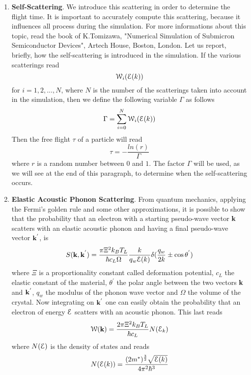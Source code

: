 \documentclass[12pt]{book}
\begin{document}
\begin{enumerate}
\item
\textbf{Self-Scattering}. We introduce this scattering in order to determine the flight time. It is important to accurately compute this scattering, because it influences all process during the simulation. For more informations about this topic, read the book of K.Tomizawa, "Numerical Simulation of Submicron Semiconductor Devices", Artech House, Boston, London.
Let us report, briefly, how the self-scattering is introduced in the simulation. If the various scatterings read
$$ {\cal{W}}_i({\cal{E}}(k)) $$
for $i=1,2,...,N$, where $N$ is the number of the scatterings taken into account in the simulation, then we define the following variable $\Gamma$ as follows
\begin{equation}
 \Gamma = \sum_{i=0}^{N} {\cal{W}}_i ({\cal{E}} (k) )
\end{equation}
Then the free flight $\tau$ of a particle will read
\begin{equation}
 \tau = -\frac{ln(r)}{\Gamma}
\end{equation}
where $r$ is a random number between $0$ and $1$.
The factor $\Gamma$ will be used, as we will see at the end of this paragraph, to determine when the self-scattering occurs.

\item
\textbf{Elastic Acoustic Phonon Scattering}.
From quantum mechanics, applying the Fermi's golden rule and some other approximations, it is possible to show that the probability that an electron with a starting pseudo-wave vector $\bf{k}$ scatters with an elastic acoustic phonon and having a final pseudo-wave vector ${\bf{k}}^{'}$, is
\begin{equation}
 S({\bf{k}},{\bf{k}}^{'}) = \frac{\pi \Xi^2 k_B T_L}{\hbar c_L \Omega}
 \frac{k}{q_w {\cal{E}}(k)} \delta (\frac{q_w}{2 k} \pm \cos {\theta}^{'})
\end{equation}
where $\Xi$ is a proportionality constant called deformation potential, $c_L$ the elastic constant of the material, $\theta^{'}$ the polar angle between the two vectors ${\bf k}$ and ${\bf k}^{'}$, $q_w$ the modulus of the phonon wave vector and $\Omega$ the volume of the crystal.
Now integrating on ${\bf{k}}^{'}$ one can easily obtain the probability that an electron of energy $\cal E$ scatters with an acoustic phonon. This last reads
\begin{equation}
{\cal{W}} ({\bf{k}}) = \frac{2 \pi \Xi^2 k_B T_L}{\hbar c_L} N({\cal{E}}_k)
\end{equation}
where $N({\cal E})$ is the density of states and reads
\begin{equation}
 N({\cal{E}}(k)) = \frac{(2 m^*)^{\frac{3}{2}} \sqrt{{\cal{E}}(k)}}{4 \pi^2 \hbar^3}
\end{equation}


\end{enumerate}
\end{document}
